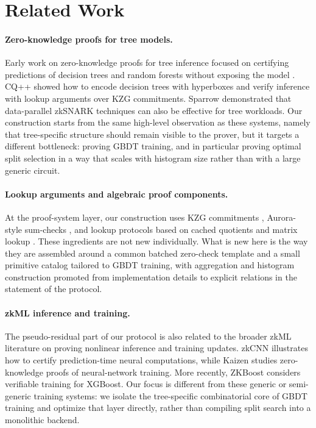 \section{Related Work}

\paragraph{Zero-knowledge proofs for tree models.}
Early work on zero-knowledge proofs for tree inference focused on certifying
predictions of decision trees and random forests without exposing the model
\cite{zkdt20}. CQ++ \cite{cq++24} showed how to encode decision trees with
hyperboxes and verify inference with lookup arguments over KZG commitments.
Sparrow \cite{sparrow24} demonstrated that data-parallel zkSNARK techniques can
also be effective for tree workloads. Our construction starts from the same
high-level observation as these systems, namely that tree-specific structure
should remain visible to the prover, but it targets a different bottleneck:
proving GBDT training, and in particular proving optimal split selection in a
way that scales with histogram size rather than with a large generic circuit.

\paragraph{Lookup arguments and algebraic proof components.}
At the proof-system layer, our construction uses KZG commitments \cite{kzg10},
Aurora-style sum-checks \cite{aurora19}, and lookup protocols based on cached
quotients and matrix lookup \cite{cq22,cq++24,baloo25}. These ingredients are
not new individually. What is new here is the way they are assembled around a
common batched zero-check template and a small primitive catalog tailored to
GBDT training, with aggregation and histogram construction promoted from
implementation details to explicit relations in the statement of the protocol.

\paragraph{zkML inference and training.}
The pseudo-residual part of our protocol is also related to the broader zkML
literature on proving nonlinear inference and training updates. zkCNN
\cite{zkcnn21} illustrates how to certify prediction-time neural computations,
while Kaizen \cite{zkdnn24} studies zero-knowledge proofs of neural-network
training. More recently, ZKBoost \cite{zkboost26} considers verifiable training
for XGBoost. Our focus is different from these generic or semi-generic training
systems: we isolate the tree-specific combinatorial core of GBDT training and
optimize that layer directly, rather than compiling split search into a
monolithic backend.
